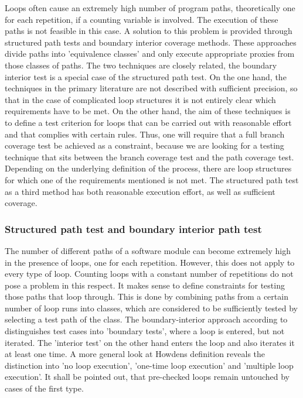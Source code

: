 
	Loops often cause an extremely high number of program paths, theoretically one for each repetition, if a counting variable is involved. The execution of these paths is not feasible in this case. A solution to this problem is provided through structured path tests and boundary interior coverage methods. These approaches divide paths into 'equivalence classes' and only execute appropriate proxies from those classes of paths. The two techniques are closely related, the boundary interior test is a special case of the structured path test. On the one hand, the techniques in the primary literature are not described with sufficient precision, so that in the case of complicated loop structures it is not entirely clear which requirements have to be met. On the other hand, the aim of these techniques is to define a test criterion for loops that can be carried out with reasonable effort and that complies with certain rules. Thus, one will require that a full branch coverage test be achieved as a constraint, because we are looking for a testing technique that sits between the branch coverage test and the path coverage test. Depending on the underlying definition of the process, there are loop structures for which one of the requirements mentioned is not met. The structured path test as a third method has both reasonable execution effort, as well as sufficient coverage.


	\subsubsection{Structured path test and boundary interior path test}

	The number of different paths of a software module can become extremely high in the presence of loops, one for each repetition. However, this does not apply to every type of loop. Counting loops with a constant number of repetitions do not pose a problem in this respect. It makes sense to define constraints for testing those paths that loop through. This is done by combining paths from a certain number of loop runs into classes, which are considered to be sufficiently tested by selecting a test path of the class. The boundary-interior approach according to  distinguishes test cases into 'boundary tests', where a loop is entered, but not iterated. The 'interior test' on the other hand enters the loop and also iterates it at least one time. A more general look at Howdens definition reveals the distinction into 'no loop execution', 'one-time loop execution' and 'multiple loop execution'. It shall be pointed out, that pre-checked loops remain untouched by cases of the first type.


